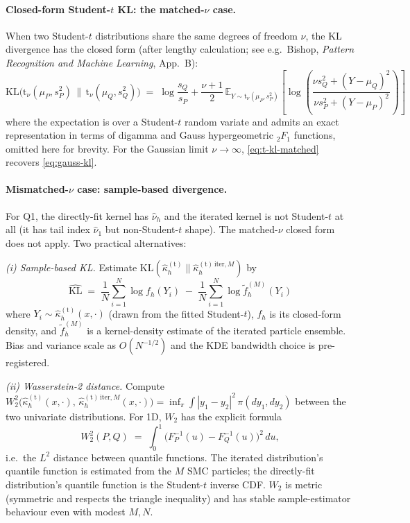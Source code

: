 \documentclass[11pt]{article}
\newcommand{\E}{\mathbb{E}}
\newcommand{\Studt}{\mathrm{t}}
\newcommand{\KL}{\mathrm{KL}}
\theoremstyle{definition}
\theoremstyle{plain}
\begin{document}
\paragraph{Closed-form Student-$t$ KL: the matched-$\nu$ case.}
When two Student-$t$ distributions share the same degrees of freedom
$\nu$, the KL divergence has the closed form (after lengthy
calculation; see e.g.\ Bishop, \emph{Pattern Recognition and Machine
Learning}, App.\ B):
\begin{equation}
  \label{eq:t-kl-matched}
  \KL\!\bigl(\Studt_{\nu}(\mu_P, s_P^{2}) \,\|\, \Studt_{\nu}(\mu_Q, s_Q^{2})\bigr)
  \;=\;
  \log\!\frac{s_Q}{s_P}
  + \frac{\nu+1}{2}\, \E_{Y \sim \Studt_{\nu}(\mu_P, s_P^{2})}
    \!\left[\log\!\left(\frac{\nu s_Q^{2} + (Y - \mu_Q)^{2}}
                              {\nu s_P^{2} + (Y - \mu_P)^{2}}\right)\right]
\end{equation}
where the expectation is over a Student-$t$ random variate and
admits an exact representation in terms of digamma and Gauss
hypergeometric ${}_2F_1$ functions, omitted here for brevity. For
the Gaussian limit $\nu \to \infty$, \eqref{eq:t-kl-matched}
recovers \eqref{eq:gauss-kl}.

\paragraph{Mismatched-$\nu$ case: sample-based divergence.}
For Q1, the directly-fit kernel has $\hat\nu_h$ and the iterated
kernel is not Student-$t$ at all (it has tail index $\hat\nu_1$
but non-Student-$t$ shape). The matched-$\nu$ closed form does
not apply. Two practical alternatives:

\emph{(i) Sample-based KL.} Estimate
$\KL(\hat\kappa_h^{(\Studt)} \| \hat\kappa_h^{(\Studt)\,\mathrm{iter},M})$
by
\begin{equation}
  \label{eq:sample-kl}
  \widehat{\KL} \;=\; \frac{1}{N} \sum_{i=1}^{N}
    \log f_h(Y_i)
  \;-\; \frac{1}{N} \sum_{i=1}^{N}
    \log \tilde f_h^{(M)}(Y_i)
\end{equation}
where $Y_i \sim \hat\kappa_h^{(\Studt)}(x, \cdot)$ (drawn from the
fitted Student-$t$), $f_h$ is its closed-form density, and
$\tilde f_h^{(M)}$ is a kernel-density estimate of the iterated
particle ensemble. Bias and variance scale as $O(N^{-1/2})$ and
the KDE bandwidth choice is pre-registered.

\emph{(ii) Wasserstein-2 distance.} Compute
$W_2^{2}\bigl(\hat\kappa_h^{(\Studt)}(x, \cdot),\,
\hat\kappa_h^{(\Studt)\,\mathrm{iter}, M}(x, \cdot)\bigr)
= \inf_{\pi} \int |y_1 - y_2|^{2}\, \pi(dy_1, dy_2)$
between the two univariate distributions. For 1D, $W_2$ has the
explicit formula
\begin{equation}
  \label{eq:w2}
  W_2^{2}(P, Q) \;=\; \int_{0}^{1} \bigl(F_P^{-1}(u) - F_Q^{-1}(u)\bigr)^{2}\, du,
\end{equation}
i.e.\ the $L^2$ distance between quantile functions. The iterated
distribution's quantile function is estimated from the $M$ SMC
particles; the directly-fit distribution's quantile function is
the Student-$t$ inverse CDF. $W_2$ is metric (symmetric and
respects the triangle inequality) and has stable sample-estimator
behaviour even with modest $M, N$.
\end{document}
